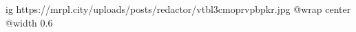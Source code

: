  
 
 
 
 

\ifcmt
  ig https://mrpl.city/uploads/posts/redactor/vtbl3cmoprvpbpkr.jpg
  @wrap center
  @width 0.6
\fi
